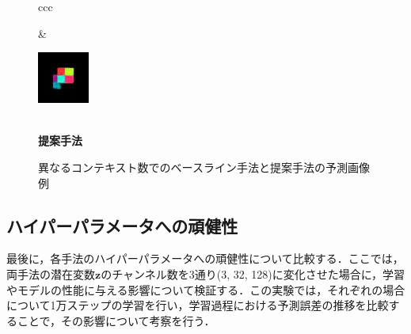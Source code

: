 \begin{figure}[tbp]
\begin{center}
\begin{tabular}{ccc}
\begin{minipage}{0.33\linewidth}
\begin{center}
        \end{center}
      \end{minipage} &
      \begin{minipage}{0.33\linewidth}
        \begin{center}
          \includegraphics[width=\linewidth]{./figures/proposal_pred_3.png}
        \end{center}
      \end{minipage} \\
       {\bf 提案手法} \\
    \end{tabular}
    \caption{異なるコンテキスト数でのベースライン手法と提案手法の予測画像例}
    \label{fig:comparison_single}
  \end{center}
\end{figure}

\subsection{ハイパーパラメータへの頑健性}
最後に，各手法のハイパーパラメータへの頑健性について比較する．ここでは，両手法の潜在変数$\bm{z}$のチャンネル数を3通り(3, 32, 128)に変化させた場合に，学習やモデルの性能に与える影響について検証する．この実験では，それぞれの場合について1万ステップの学習を行い，学習過程における予測誤差の推移を比較することで，その影響について考察を行う．

